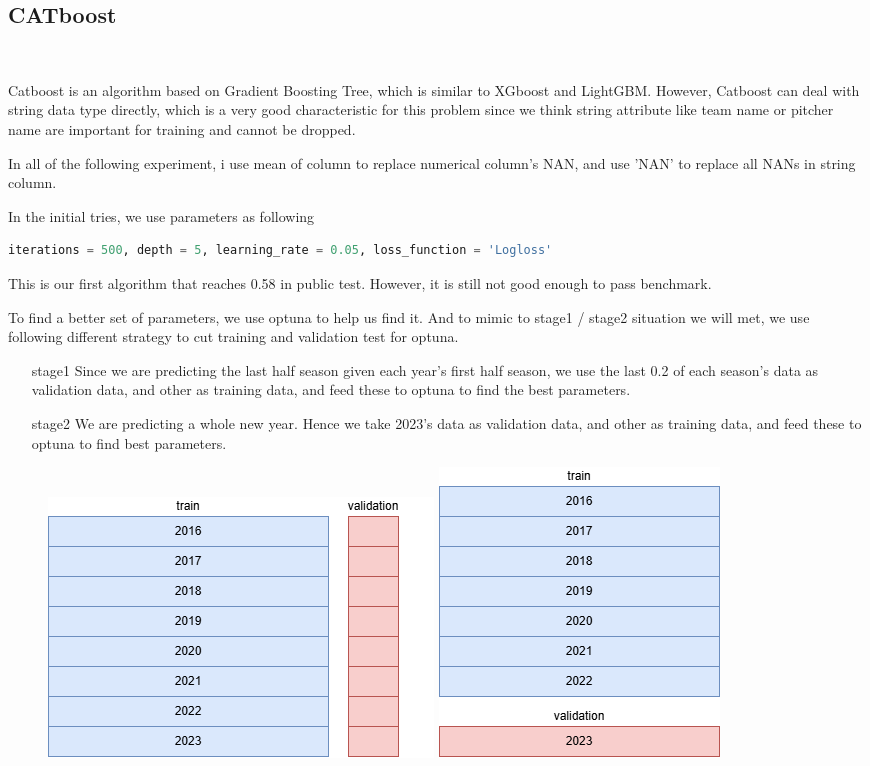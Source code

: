 \subsection*{CATboost}
\ \par Catboost is an algorithm based on Gradient Boosting Tree, which is similar to XGboost and LightGBM. However, Catboost can deal with string data type directly, which is a very good characteristic for this problem since we think string attribute like team name or pitcher name are important for training and cannot be dropped. 
\par In all of the following experiment, i use mean of column to replace numerical column's NAN, and use 'NAN' to replace all NANs in string column. 
\par In the initial tries, we use parameters as following
\begin{lstlisting}[language=Python]
iterations = 500, depth = 5, learning_rate = 0.05, loss_function = 'Logloss'
\end{lstlisting}
\par This is our first algorithm that reaches 0.58 in public test. However, it is still not good enough to pass benchmark. 
\par To find a better set of parameters, we use optuna to help us find it. And to mimic to stage1 / stage2 situation we will met, we use following different strategy to cut training and validation test for optuna.
\begin{itemize}
    \item[stage1] Since we are predicting the last half season given each year's first half season, we use the last 0.2 of each season's data as validation data, and other as training data, and feed these to optuna to find the best parameters.
    \item[stage2] We are predicting a whole new year. Hence we take 2023's data as validation data, and other as training data, and feed these to optuna to find best parameters.
\end{itemize}
\begin{figure}[h]
    \centering
    \includegraphics[width=0.25\linewidth]{Pictures/MLdatacut_stage1.drawio.png}
    \includegraphics[width=0.17\linewidth]{Pictures/MLdatacut_stage2.drawio.png}
\end{figure}
